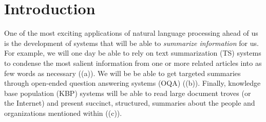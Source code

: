 
\chapter{\label{chap:intro} Introduction}

One of the most exciting applications of natural language processing ahead of us is the development of systems that will be able to \textit{summarize information}  for us.
For example, we will one day be able to rely on 
text summarization (TS) systems to condense the most salient information from one or more related articles into as few words as necessary ((a)).
We will be be able to get targeted summaries through open-ended question answering systems (OQA) ((b)).
Finally, knowledge base population (KBP) systems  will be able to read large document troves (or the Internet) and present succinct, structured, summaries about the people and organizations mentioned within ((c)).


